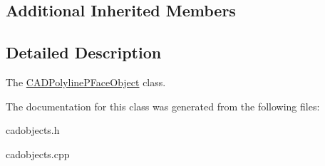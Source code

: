 \subsection*{Additional Inherited Members}


\subsection{Detailed Description}
The \hyperlink{class_c_a_d_polyline_p_face_object}{C\+A\+D\+Polyline\+P\+Face\+Object} class. 

The documentation for this class was generated from the following files\+:\begin{DoxyCompactItemize}
\item 
cadobjects.\+h\item 
cadobjects.\+cpp\end{DoxyCompactItemize}
